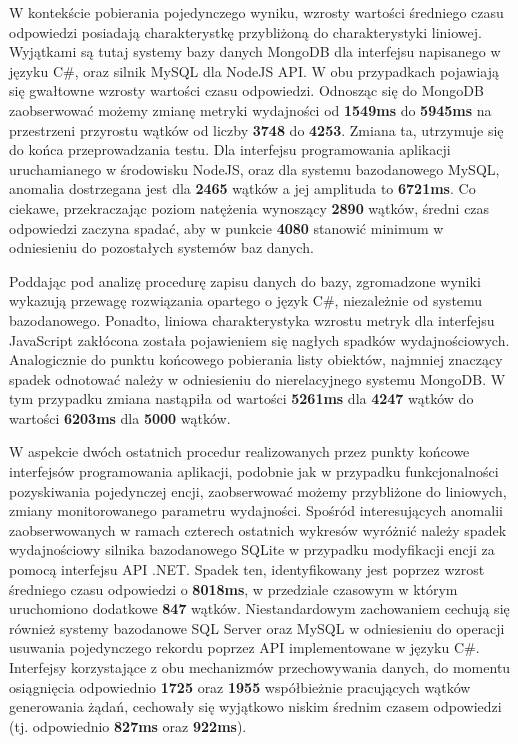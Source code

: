 W kontekście pobierania pojedynczego wyniku, wzrosty wartości średniego czasu odpowiedzi posiadają charakterystkę przybliżoną do charakterystyki liniowej. Wyjątkami są tutaj systemy bazy danych MongoDB dla interfejsu napisanego w języku C\#, oraz silnik MySQL dla NodeJS API. W obu przypadkach pojawiają się gwałtowne wzrosty wartości czasu odpowiedzi. Odnosząc się do MongoDB zaobserwować możemy zmianę metryki wydajności od \textbf{1549ms} do \textbf{5945ms} na przestrzeni przyrostu wątków od liczby \textbf{3748} do \textbf{4253}. Zmiana ta, utrzymuje się do końca przeprowadzania testu. Dla interfejsu programowania aplikacji uruchamianego w środowisku NodeJS, oraz dla systemu bazodanowego MySQL, anomalia dostrzegana jest dla \textbf{2465} wątków a jej amplituda to \textbf{6721ms}. Co ciekawe, przekraczając poziom natężenia wynoszący \textbf{2890} wątków, średni czas odpowiedzi zaczyna spadać, aby w punkcie \textbf{4080} stanowić minimum w odniesieniu do pozostałych systemów baz danych.

Poddając pod analizę procedurę zapisu danych do bazy, zgromadzone wyniki wykazują przewagę rozwiązania opartego o język C\#, niezależnie od systemu bazodanowego. Ponadto, liniowa charakterystyka wzrostu metryk dla interfejsu JavaScript zakłócona została pojawieniem się nagłych spadków wydajnościowych. Analogicznie do punktu końcowego pobierania listy obiektów, najmniej znaczący spadek odnotować należy w odniesieniu do nierelacyjnego systemu MongoDB. W tym przypadku zmiana nastąpiła od wartości \textbf{5261ms} dla \textbf{4247} wątków do wartości \textbf{6203ms} dla \textbf{5000} wątków.
    
W aspekcie dwóch ostatnich procedur realizowanych przez punkty końcowe interfejsów programowania aplikacji, podobnie jak w przypadku funkcjonalności pozyskiwania pojedynczej encji, zaobserwować możemy przybliżone do liniowych, zmiany monitorowanego parametru wydajności. Spośród interesujących anomalii zaobserwowanych w ramach czterech ostatnich wykresów wyróżnić należy spadek wydajnościowy silnika bazodanowego SQLite w przypadku modyfikacji encji za pomocą interfejsu API .NET. Spadek ten, identyfikowany jest poprzez wzrost średniego czasu odpowiedzi o \textbf{8018ms}, w przedziale czasowym w którym uruchomiono dodatkowe \textbf{847} wątków. Niestandardowym zachowaniem cechują się również systemy bazodanowe SQL Server oraz MySQL w odniesieniu do operacji usuwania pojedynczego rekordu poprzez API implementowane w języku C\#. Interfejsy korzystające z obu mechanizmów przechowywania danych, do momentu osiągnięcia odpowiednio \textbf{1725} oraz \textbf{1955} współbieżnie pracujących wątków generowania żądań, cechowały się wyjątkowo niskim średnim czasem odpowiedzi (tj. odpowiednio \textbf{827ms} oraz \textbf{922ms}).

